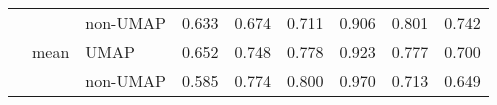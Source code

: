 \begin{tabular}{lllrrrrrr}
       &      & non-UMAP &                                      0.633 &                                       0.674 &                                       0.711 &                                       0.906 &                                        0.801 &                                        0.742 \\
       & mean & UMAP &                                      0.652 &                                       0.748 &                                       0.778 &                                       0.923 &                                        0.777 &                                        0.700 \\
       &      & non-UMAP &                                      0.585 &                                       0.774 &                                       0.800 &                                       0.970 &                                        0.713 &                                        0.649 \\
\bottomrule
\end{tabular}
